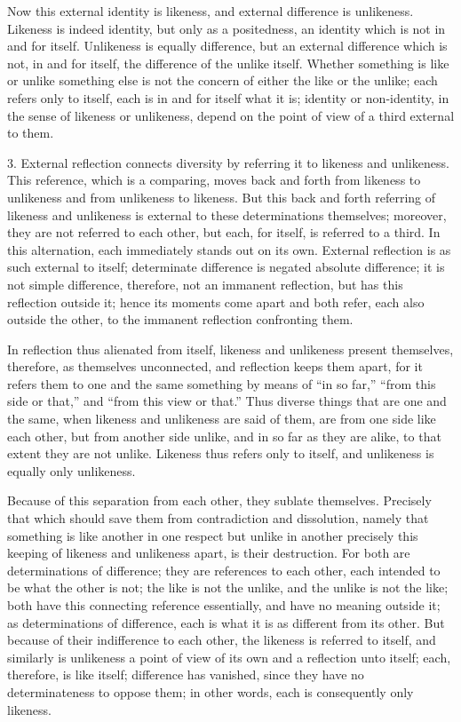 Now this external identity is likeness,
and external difference is unlikeness.
Likeness is indeed identity, but only as a positedness,
an identity which is not in and for itself.
Unlikeness is equally difference,
but an external difference which is not, in and for itself,
the difference of the unlike itself.
Whether something is like or unlike something else is
not the concern of either the like or the unlike;
each refers only to itself, each is in and for itself what it is;
identity or non-identity, in the sense of likeness or unlikeness,
depend on the point of view of a third external to them.

3. External reflection connects diversity by referring it to likeness and
unlikeness. This reference, which is a comparing, moves back and forth from
likeness to unlikeness and from unlikeness to likeness. But this back and
forth referring of likeness and unlikeness is external to these determinations
themselves; moreover, they are not referred to each other, but each, for itself,
is referred to a third. In this alternation, each immediately stands out on its
own.  External reflection is as such external to itself; determinate difference
is negated absolute difference; it is not simple difference, therefore, not an
immanent reflection, but has this reflection outside it; hence its moments
come apart and both refer, each also outside the other, to the immanent
reflection confronting them.

In reflection thus alienated from itself, likeness and unlikeness present
themselves, therefore, as themselves unconnected, and reflection keeps them
apart, for it refers them to one and the same something by means of “in so
far,” “from this side or that,” and “from this view or that.” Thus diverse
things that are one and the same, when likeness and unlikeness are said of
them, are from one side like each other, but from another side unlike, and
in so far as they are alike, to that extent they are not unlike. Likeness thus
refers only to itself, and unlikeness is equally only unlikeness.

Because of this separation from each other, they sublate themselves.
Precisely that which should save them from contradiction and dissolution,
namely that something is like another in one respect but unlike in another
precisely this keeping of likeness and unlikeness apart, is their destruction.
For both are determinations of difference; they are references to each other,
each intended to be what the other is not; the like is not the unlike, and the
unlike is not the like; both have this connecting reference essentially, and
have no meaning outside it; as determinations of difference, each is what it
is as different from its other. But because of their indifference to each other,
the likeness is referred to itself, and similarly is unlikeness a point of view of
its own and a reflection unto itself; each, therefore, is like itself; difference
has vanished, since they have no determinateness to oppose them; in other
words, each is consequently only likeness.

